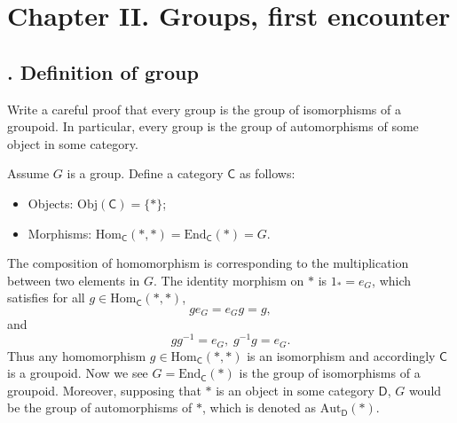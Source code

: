 \documentclass[12pt,letterpaper,boxed]{hmcpset}
\begin{document}
\newpage
\section{Chapter II.\hspace{0.2em} Groups, first encounter}

\subsection{. Definition of group}
\begin{problem}[1.1]
	Write a careful proof that every group is the group of isomorphisms of a groupoid. In particular, every group is the group of automorphisms of some object in some category.
\end{problem}
\begin{solution}
	Assume $G$ is a group. Define a category $\mathsf{C}$ as follows:
	\begin{itemize}
		\item Objects: $\mathrm{Obj}(\mathsf{C})=\{*\}$;
		\item Morphisms: $\mathrm{Hom}_\mathsf{C}(*,*)=\mathrm{End}_\mathsf{C}(*)=G$.
	\end{itemize}	
	The composition of homomorphism is corresponding to the multiplication between two elements in $G$. The identity morphism on $*$ is $1_*=e_G$, which satisfies for all $g\in \mathrm{Hom}_\mathsf{C}(*,*)$,
	\[
	ge_G=e_Gg=g,
	\]
	and
	\[
	gg^{-1}=e_G,\;g^{-1}g=e_G.
	\]
	Thus any homomorphism $g\in \mathrm{Hom}_\mathsf{C}(*,*)$ is an isomorphism and accordingly $\mathsf{C}$ is a groupoid. Now we see $G=\mathrm{End}_\mathsf{C}(*)$ is the group of isomorphisms of a groupoid. Moreover, supposing that $*$ is an object in some category $\mathsf{D}$, $G$ would be the group of automorphisms of $*$, which is denoted as $\mathrm{Aut}_\mathsf{D}(*)$.
\end{solution}
\end{document}
